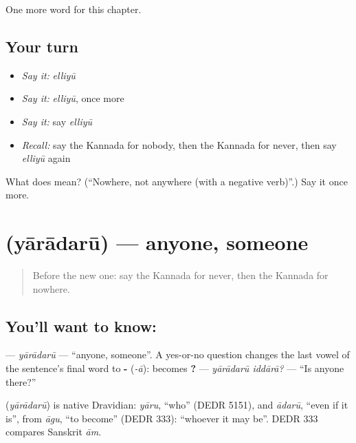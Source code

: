 \begin{grammarlens}[title={What you've built}]
One more word for this chapter.
\end{grammarlens}

\subsection*{Your turn}
\begin{itemize}
\raggedright
  \item \emph{Say it:} \emph{elliyū}
  \item \emph{Say it:} \emph{elliyū}, once more
  \item \emph{Say it:} say \emph{elliyū}
  \item \emph{Recall:} say the Kannada for nobody, then the Kannada for never, then say \emph{elliyū} again
\end{itemize}

\begin{tcolorbox}[breakable,colback=teal!4,colframe=teal!35!black,title={Before you move on}]
What does  mean? (\textquotedblleft{}Nowhere, not anywhere (with a negative verb)\textquotedblright{}.) Say it once more.
\end{tcolorbox}
\section[\texorpdfstring{\kn{ಯಾರಾದರೂ} (yārādarū)}{ಯಾರಾದರೂ (yārādarū)}]{ (yārādarū) — anyone, someone}

\label{lesson:KA-C154-yaradaru}



\begin{quote}
Before the new one: say the Kannada for never, then the Kannada for nowhere.
\end{quote}

\subsection*{You'll want to know: }
\textbf{} — \emph{yārādarū} — \textquotedblleft{}anyone, someone\textquotedblright{}. A yes-or-no question changes the last vowel of the sentence's final word to \textbf{-} (\emph{-ā}): \textbf{} becomes \textbf{ ?} — \emph{yārādarū iddārā?} — \textquotedblleft{}Is anyone there?\textquotedblright{}

\begin{cousinweb}
\textbf{} (\emph{yārādarū}) is native Dravidian: \emph{yāru}, \textquotedblleft{}who\textquotedblright{} (DEDR 5151), and \emph{ādarū}, \textquotedblleft{}even if it is\textquotedblright{}, from \emph{āgu}, \textquotedblleft{}to become\textquotedblright{} (DEDR 333): \textquotedblleft{}whoever it may be\textquotedblright{}. DEDR 333 compares Sanskrit \emph{ām}.
\end{cousinweb}

